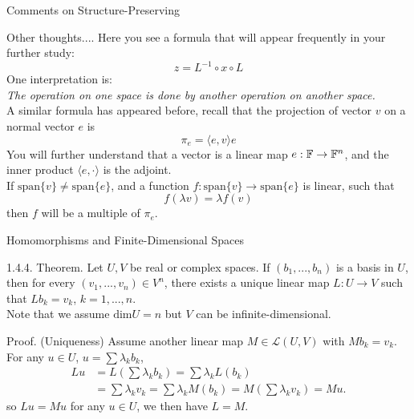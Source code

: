 \documentclass[hyperref={pdfpagelabels=true}]{beamer}
\newcommand{\structb}[1]{\textcolor[rgb]{0.2,0.2,0.7}{#1}}
\newcommand{\<}{\langle}
\renewcommand{\>}{\rangle}
\newenvironment{shrinkeq}[1]%
{ \bgroup
  \addtolength\abovedisplayshortskip{#1}
  \addtolength\abovedisplayskip{#1}
  \addtolength\belowdisplayshortskip{#1}
  \addtolength\belowdisplayskip{#1}}
{\egroup\ignorespacesafterend}
\begin{document}
\begin{frame}{Comments on Structure-Preserving}
    \begin{block}{Other thoughts....}
        Here you see a formula that will appear frequently in your further study:
        \begin{shrinkeq}{-0.3em}
        \[z = L^{-1} \circ x \circ L\]
        \end{shrinkeq}
        One interpretation is:\\
        \textit{The operation on one space is done by another operation on another space.}\\
        A similar formula has appeared before, recall that the projection of vector $v$ on a normal vector $e$ is 
        \begin{shrinkeq}{-0.5em}
        \[\pi_{e} = \<e,v\>e\]
        \end{shrinkeq}
        You will further understand that a vector is a linear map $e:\mathbb{F} \rightarrow \mathbb{F}^{n}$, and the inner product $\<e,\cdot\>$ is the adjoint.\\
        If $\text{span}\{v\} \neq \text{span}\{e\}$, and a function $f:\text{span}\{v\} \rightarrow \text{span}\{e\}$ is linear, such that 
        \begin{shrinkeq}{-0.3em}
        \[f(\lambda v) = \lambda f(v)\]
        \end{shrinkeq}
        then $f$ will be a multiple of $\pi_{e}$.
    \end{block}
\end{frame}
\begin{frame}{Homomorphisms and Finite-Dimensional Spaces}
    \begin{block}{1.4.4. Theorem.}
        Let $U,V$ be real or complex spaces. If $(b_{1},...,b_{n})$ is a basis in $U$, then for every $(v_{1},...,v_{n}) \in V^{n}$, there exists a unique linear map $L:U \rightarrow V$ such that $Lb_{k} = v_{k}$, $k = 1,...,n$.\\
        Note that we assume $\text{dim}U = n$ but $V$ can be infinite-dimensional.
    \end{block}
    \begin{block}{Proof.}
        \structb{(Uniqueness)} Assume another linear map $M \in \mathcal{L}(U,V)$ with $Mb_{k} = v_{k}$.\\
        For any $u \in U$, $u = \sum \lambda_{k}b_{k}$,
        \[
            \begin{aligned}
                Lu &= L(\sum \lambda_{k}b_{k}) = \sum \lambda_{k}L(b_{k}) \\
                &= \sum \lambda_{k} v_{k} = \sum \lambda_{k} M(b_{k}) = M(\sum \lambda_{k} v_{k}) = Mu.
            \end{aligned}
        \]
        so $Lu = Mu$ for any $u \in U$, we then have $L = M$.
    \end{block}
\end{frame}
\end{document}
